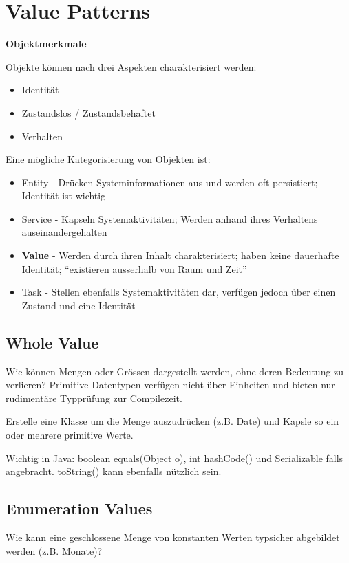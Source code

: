 \section{Value Patterns}

\textbf{Objektmerkmale}

Objekte können nach drei Aspekten charakterisiert werden:

\begin{itemize}
	\item Identität
	\item Zustandslos / Zustandsbehaftet
	\item Verhalten
\end{itemize}

Eine mögliche Kategorisierung von Objekten ist:

\begin{itemize}
	\item Entity - Drücken Systeminformationen aus und werden oft persistiert; Identität ist wichtig
	\item Service - Kapseln Systemaktivitäten; Werden anhand ihres Verhaltens auseinandergehalten
	\item \textbf{Value} - Werden durch ihren Inhalt charakterisiert; haben keine dauerhafte Identität; ``existieren ausserhalb von Raum und Zeit''
	\item Task - Stellen ebenfalls Systemaktivitäten dar, verfügen jedoch über einen Zustand und eine Identität
\end{itemize}

\subsection{Whole Value}

Wie können Mengen oder Grössen dargestellt werden, ohne deren Bedeutung zu verlieren? Primitive Datentypen verfügen nicht über Einheiten und bieten nur rudimentäre Typprüfung zur Compilezeit.

Erstelle eine Klasse um die Menge auszudrücken (z.B. Date) und Kapsle so ein oder mehrere primitive Werte.

Wichtig in Java: boolean equals(Object o), int hashCode() und Serializable falls angebracht. toString() kann ebenfalls nützlich sein.

\subsection{Enumeration Values}

Wie kann eine geschlossene Menge von konstanten Werten typsicher abgebildet werden (z.B. Monate)?

